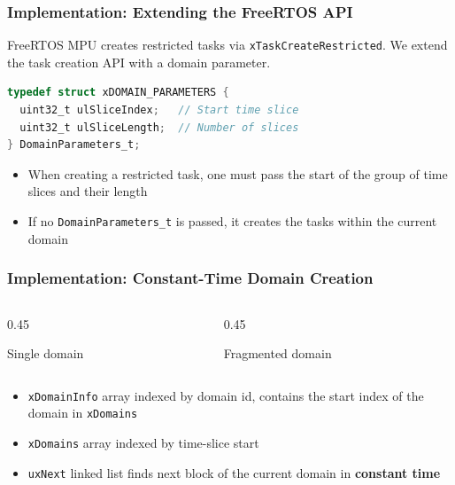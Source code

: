 \begin{frame}[fragile]
\frametitle{Implementation: Extending the FreeRTOS API}
FreeRTOS MPU creates restricted tasks via \texttt{xTaskCreateRestricted}.
We extend the task creation API with a domain parameter.

\vspace{0.2cm}
\begin{lstlisting}[language=C, basicstyle=\scriptsize\ttfamily]
typedef struct xDOMAIN_PARAMETERS {
  uint32_t ulSliceIndex;   // Start time slice
  uint32_t ulSliceLength;  // Number of slices
} DomainParameters_t;
\end{lstlisting}

\begin{itemize}
  \item When creating a restricted task, one must pass the start of the group of time
slices and their length
\item If no \texttt{DomainParameters\_t} is passed, it creates the tasks within the current domain
\end{itemize}

\end{frame}

\begin{frame}[fragile]
\frametitle{Implementation: Constant-Time Domain Creation}

\begin{columns}
\begin{column}{0.45\textwidth}
\begin{center}
\small Single domain\\[0.2cm]
\resizebox{\textwidth}{!}{}
\end{center}
\end{column}
\begin{column}{0.45\textwidth}
\begin{center}
\small Fragmented domain\\[0.2cm]
\resizebox{\textwidth}{!}{}
\end{center}
\end{column}
\end{columns}

\vspace{0.3cm}
\begin{itemize}
  \item \texttt{xDomainInfo} array indexed by domain id, contains the start index of the domain in \texttt{xDomains}
  \item \texttt{xDomains} array indexed by time-slice start
  \item \texttt{uxNext} linked list finds next block of the current domain in \textbf{constant time}
\end{itemize}

\end{frame}

